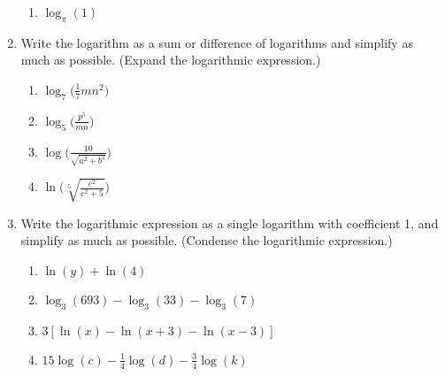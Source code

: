 \begin{enumerate}
\begin{enumerate}
\item $\log_{\pi}(1)$\\



\end{enumerate}






\item Write the logarithm as a sum or difference of logarithms and simplify as much as possible.  (Expand the logarithmic expression.)
\begin{enumerate}
\item $ \displaystyle \log_7\Big(\frac{1}{7}mn^2\Big)$ 
\vfill
\item $\displaystyle \log_5\Big(\frac{p^5}{mn}\Big)$ 
\vfill

\item $\displaystyle \log\Bigg(\frac{10}{\sqrt{a^2+b^2}}\Bigg)$ 
\vfill

\item $\displaystyle \ln\Bigg(\sqrt[5]{\frac{e^2}{c^2+5}}\Bigg)$ 
\vfill


\end{enumerate}

\newpage

\item Write the logarithmic expression as a single logarithm with coefficient 1, and simplify as much as possible.  (Condense the logarithmic expression.)


\begin{enumerate}
\item $\ln(y)+\ln(4)$\vfill
\item $\log_3(693)-\log_3(33)-\log_3(7)$\vfill
\item $3[\ln(x)-\ln(x+3)-\ln(x-3)]$\vfill
\item $\displaystyle 15\log(c)-\frac{1}{4}\log(d)-\frac{3}{4}\log(k)$\vfill
\end{enumerate}






\end{enumerate}



